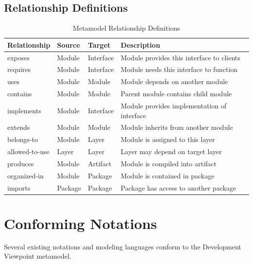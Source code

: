 \documentclass[11pt,letterpaper]{article}
\begin{document}
\subsection{Relationship Definitions}

\begin{table}[H]
\centering
\caption{Metamodel Relationship Definitions}
\small
\begin{tabular}{@{}L{2.5cm}L{2cm}L{2cm}L{7cm}@{}}
\toprule
\textbf{Relationship} & \textbf{Source} & \textbf{Target} & \textbf{Description} \\
\midrule
exposes & Module & Interface & Module provides this interface to clients \\
\addlinespace
requires & Module & Interface & Module needs this interface to function \\
\addlinespace
uses & Module & Module & Module depends on another module \\
\addlinespace
contains & Module & Module & Parent module contains child module \\
\addlinespace
implements & Module & Interface & Module provides implementation of interface \\
\addlinespace
extends & Module & Module & Module inherits from another module \\
\addlinespace
belongs-to & Module & Layer & Module is assigned to this layer \\
\addlinespace
allowed-to-use & Layer & Layer & Layer may depend on target layer \\
\addlinespace
produces & Module & Artifact & Module is compiled into artifact \\
\addlinespace
organized-in & Module & Package & Module is contained in package \\
\addlinespace
imports & Package & Package & Package has access to another package \\
\bottomrule
\end{tabular}
\end{table}

\section{Conforming Notations}

Several existing notations and modeling languages conform to the Development Viewpoint metamodel.
\end{document}
